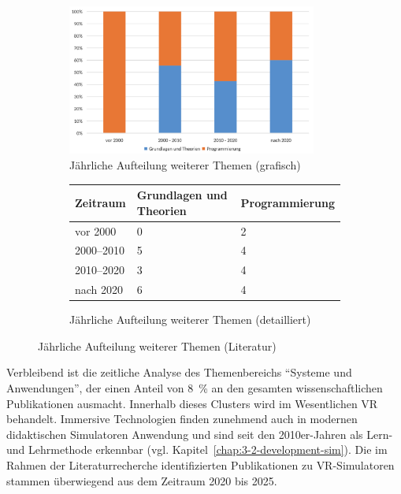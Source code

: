 \begin{figure}[!htbp]
    \centering
    \begin{subfigure}[b]{0.48\textwidth}
        \centering
        \includegraphics[width=0.90\textwidth]{graphics_lit/5-top5-themen-jahr.png}
        \caption{Jährliche Aufteilung weiterer Themen (grafisch)}
        \label{fig:5-top5-themen}
    \end{subfigure}
    \hfill
    \begin{subfigure}[b]{0.48\textwidth}
        \centering
        \tiny
        \begin{tabularx}{\textwidth}{lXX}
            \hline
            \textbf{Zeitraum} & \textbf{Grundlagen und Theorien} & \textbf{Programmierung} \\
            \hline
            vor 2000      & 0 & 2 \\
            2000--2010    & 5 & 4 \\
            2010--2020    & 3 & 4 \\
            nach 2020     & 6 & 4 \\
            \hline
        \end{tabularx}
        \caption{Jährliche Aufteilung weiterer Themen (detailliert)}
        \label{tab:themen-zeit-2}
    \end{subfigure}
    \caption{Jährliche Aufteilung weiterer Themen (Literatur)}
    \label{fig:pub-typen}
\end{figure}

Verbleibend ist die zeitliche Analyse des Themenbereichs \enquote{Systeme und Anwendungen}, der einen Anteil von 8~\% an den gesamten wissenschaftlichen Publikationen ausmacht. Innerhalb dieses Clusters wird im Wesentlichen \acs{VR} behandelt. Immersive Technologien finden zunehmend auch in modernen didaktischen Simulatoren Anwendung und sind seit den 2010er-Jahren als Lern- und Lehrmethode erkennbar (vgl. Kapitel~\ref{chap:3-2-development-sim}). Die im Rahmen der Literaturrecherche identifizierten Publikationen zu \ac{VR}-Simulatoren stammen überwiegend aus dem Zeitraum 2020 bis 2025.

